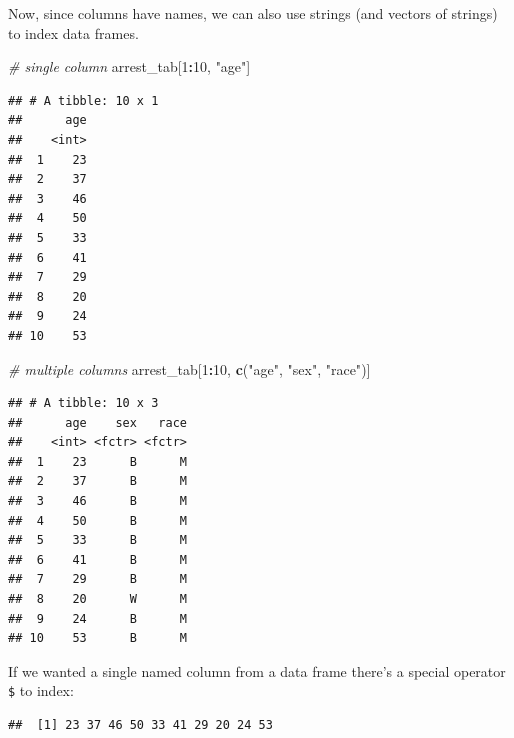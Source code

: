 \documentclass[]{book}
\newenvironment{Shaded}{\begin{snugshade}}{\end{snugshade}}
\newcommand{\KeywordTok}[1]{\textcolor[rgb]{0.13,0.29,0.53}{\textbf{#1}}}
\newcommand{\DecValTok}[1]{\textcolor[rgb]{0.00,0.00,0.81}{#1}}
\newcommand{\StringTok}[1]{\textcolor[rgb]{0.31,0.60,0.02}{#1}}
\newcommand{\CommentTok}[1]{\textcolor[rgb]{0.56,0.35,0.01}{\textit{#1}}}
\newcommand{\OperatorTok}[1]{\textcolor[rgb]{0.81,0.36,0.00}{\textbf{#1}}}
\newcommand{\NormalTok}[1]{#1}
\theoremstyle{definition}
\theoremstyle{definition}
\theoremstyle{remark}
\begin{document}
Now, since columns have names, we can also use strings (and vectors of
strings) to index data frames.

\begin{Shaded}
\begin{Highlighting}[]
\CommentTok{# single column}
\NormalTok{arrest_tab[}\DecValTok{1}\OperatorTok{:}\DecValTok{10}\NormalTok{, }\StringTok{"age"}\NormalTok{]}
\end{Highlighting}
\end{Shaded}

\begin{verbatim}
## # A tibble: 10 x 1
##      age
##    <int>
##  1    23
##  2    37
##  3    46
##  4    50
##  5    33
##  6    41
##  7    29
##  8    20
##  9    24
## 10    53
\end{verbatim}

\begin{Shaded}
\begin{Highlighting}[]
\CommentTok{# multiple columns}
\NormalTok{arrest_tab[}\DecValTok{1}\OperatorTok{:}\DecValTok{10}\NormalTok{, }\KeywordTok{c}\NormalTok{(}\StringTok{"age"}\NormalTok{, }\StringTok{"sex"}\NormalTok{, }\StringTok{"race"}\NormalTok{)]}
\end{Highlighting}
\end{Shaded}

\begin{verbatim}
## # A tibble: 10 x 3
##      age    sex   race
##    <int> <fctr> <fctr>
##  1    23      B      M
##  2    37      B      M
##  3    46      B      M
##  4    50      B      M
##  5    33      B      M
##  6    41      B      M
##  7    29      B      M
##  8    20      W      M
##  9    24      B      M
## 10    53      B      M
\end{verbatim}

If we wanted a single named column from a data frame there's a special
operator \texttt{\$} to index:

\begin{Shaded}
\end{Shaded}

\begin{verbatim}
##  [1] 23 37 46 50 33 41 29 20 24 53
\end{verbatim}
\end{document}
